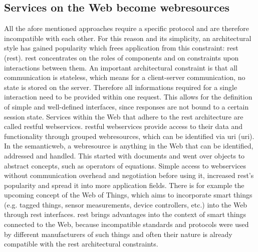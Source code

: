 \subsection{Services on the Web become \glspl{webresource}}
All the afore mentioned approaches require a specific protocol and are therefore incompatible with each other.
For this reason and its simplicity, an architectural style has gained popularity which frees application from this constraint: \textrm{\acrlong{rest} (\acrshort{rest})}\cite{fielding2000architectural}.
\textrm{\acrshort{rest}} concentrates on the roles of components and on constraints upon interactions between them.
An important architectural constraint is that all communication is stateless, which means for a client-server communication, no state is stored on the server.
Therefore all informations required for a single interaction need to be provided within one request.
This allows for the definition of simple and well-defined interfaces, since responses are not bound to a certain session state. 
Services within the Web that adhere to the \textrm{\acrshort{rest}} architecture are called \textrm{\acrshort{rest}ful \glspl{webservice}}.
\textrm{\acrshort{rest}ful \glspl{webservice}} provide access to their data and functionality through grouped \textrm{\glspl{webresource}}, which can be identified via \textrm{\acrlong{uri} (\acrshort{uri})}\cite{masinter2005uniform}.
In the \textrm{\gls{semanticweb}}\cite{berners2001semantic}, a \gls{webresource} is anything in the Web that can be identified, addressed and handled.
This started with documents and went over objects to abstract concepts, such as operators of equations.
Simple access to \textrm{\glspl{webservice}} without communication overhead and negotiation before using it, increased \textrm{\acrshort{rest}}'s popularity and spread it into more application fields.
There is for example the upcoming concept of the \textrm{Web of Things}\cite{5678452}, which aims to incorporate smart things (e.g. tagged things, sensor measurements, device controllers, etc.) into the Web through \textrm{\acrshort{rest}} interfaces.
\textrm{\acrshort{rest}} brings advantages into the context of smart things connected to the Web, because incompatible standards and protocols were used by different manufacturers of such things and often their nature is already compatible with the \textrm{\acrshort{rest}} architectural constraints.


